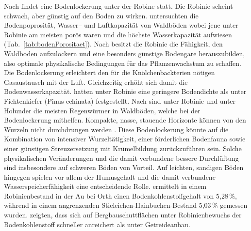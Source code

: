 \documentclass[twocolumn]{scrartcl}
\begin{document}
Nach
\citet[S.~474, 483]{ramann1898influssBodendeckeAufPhysikalischeBodeneigenschaften}
findet eine Bodenlockerung unter der Robine statt.  Die Robinie
scheint schwach, aber günstig auf den Boden zu wirken.
\citet{nemec1925waldboden} untersuchten die Bodenpoprosität, Wasser--
und Luftkapazität von Waldböden wobei jene unter Robinie am meisten
porös waren und die höchste Wasserkapazität aufwiesen
(Tab.~\ref{tab:bodenPorositaet}).
Nach
\citet{albert1926robinieBodenlockerheit,penschuck1931robinieBodenphysik}
besitzt die Robinie die Fähigkeit, den Waldboden aufzulockern und eine
besonders günstige Bodengare herauszubilden, also optimale
physikalische Bedingungen für das Pflanzenwachstum zu schaffen.  Die
Bodenlockerung erleichtert den für die Knölchenbackterien nötigen
Gasaustausch mit der Luft. Gleichzeitig erhöht sich damit die
Bodenwasserkapazität.
\citet{ashby1986robinieWuchssteigerung} hatten unter Robinie eine geringere
Bodendichte als unter Fichtenkiefer (Pinus echinata) festgestellt.
Nach \citet{bluemke1955robinie} sind unter Robinie und unter Holunder
die meisten Regenwürmer in Waldböden, welche bei der Bodenlockerung
mithelfen.
Kompakte, nasse, stauende Horizonte können
von den Wurzeln nicht durchdrungen werden \citep{mueller1991robinie}.
Diese Bodenlockerung könnte auf die Kombination von intensiver
Wurzeltätigkeit, einer förderlichen Bodenfauna sowie einer günstigen
Streuzersetzung mit Krümelbildung zurückzuführen sein. Solche
physikalischen Veränderungen und die damit verbundene bessere
Durchlüftung sind insbesondere auf schweren Böden von Vorteil. Auf
leichten, sandigen Böden hingegen spielen vor allem der Humusgehalt
und die damit verbundene Wasserspeicherfähigkeit eine entscheidende
Rolle. \citet{kastler2013robinieBoden} ermittelt in einem
Robinienbestand in der Au bei Orth einen Bodenkohlenstoffgehalt von
5,28\,\%, während in einem angrenzenden Stieleichen-Hainbuchen-Bestand
5,03\,\% gemessen wurden. \citet{kanzler2021robinieBodenc} zeigten,
dass sich auf Bergbauschuttflächen unter Robinienbewuchs der
Bodenkohlenstoff schneller anreichert als unter Getreideanbau.

\begin{table}[htbp]
  \centering
  \caption{Bodenpoprosität, Wasser-- und Luftkapazität in \% von Waldböden unter verschiedenen Baumarten nach \citet{nemec1925waldboden}}
  \label{tab:bodenPorositaet}
\end{table}
\end{document}
